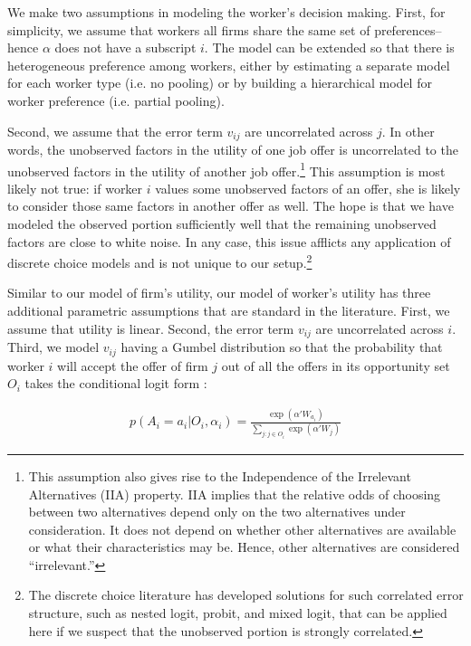 We make two assumptions in modeling the worker's decision making. First, for
simplicity, we assume that workers all firms share the same set of
preferences--hence $\alpha$ does not have a subscript $i$. The model can be
extended so that there is heterogeneous preference among workers, either by
estimating a separate model for each worker type (i.e. no pooling) or by
building a hierarchical model for worker preference (i.e. partial pooling).

Second, we assume that the error term $v_{ij}$ are uncorrelated across $j$. In
other words, the unobserved factors in the utility of one job offer is
uncorrelated to the unobserved factors in the utility of another job
offer.\footnote{This assumption also gives rise to the Independence of the
  Irrelevant Alternatives (IIA) property. IIA implies that the relative odds of
  choosing between two alternatives depend only on the two alternatives under
  consideration. It does not depend on whether other alternatives are available
  or what their characteristics may be. Hence, other alternatives are considered
  ``irrelevant.''} This assumption is most likely not true: if worker $i$ values
some unobserved factors of an offer, she is likely to consider those same
factors in another offer as well. The hope is that we have modeled the observed
portion sufficiently well that the remaining unobserved factors are close to
white noise. In any case, this issue afflicts any application of discrete choice
models and is not unique to our setup.\footnote{The discrete choice literature
  has developed solutions for such correlated error structure, such as nested
  logit, probit, and mixed logit, that can be applied here if we suspect that
  the unobserved portion is strongly correlated.}

Similar to our model of firm's utility, our model of worker's utility has three
additional parametric assumptions that are standard in the literature. First, we
assume that utility is linear. Second, the error term $v_{ij}$ are uncorrelated
across $i$. Third, we model $v_{ij}$ having a Gumbel distribution so that the
probability that worker $i$ will accept the offer of firm $j$ out of all the
offers in its opportunity set $O_i$ takes the conditional logit form
\citep{Cameron2005}:

\begin{align}
  p(A_i = a_i | O_i, \alpha_i) = \frac{\exp(\alpha'W_{a_i})}{\sum\limits_{j:j \in O_i} \exp(\alpha'W_j)} \label{eq:conditional_probability_of_accept}
\end{align}

